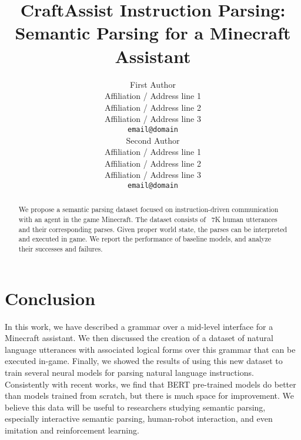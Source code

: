 \documentclass[11pt,a4paper]{article}
\title{CraftAssist Instruction Parsing: Semantic Parsing for a Minecraft Assistant}
\author{First Author \\
  Affiliation / Address line 1 \\
  Affiliation / Address line 2 \\
  Affiliation / Address line 3 \\
  {\tt email@domain} \\\And
  Second Author \\
  Affiliation / Address line 1 \\
  Affiliation / Address line 2 \\
  Affiliation / Address line 3 \\
  {\tt email@domain} \\}
\date{}
\begin{document}
\maketitle
\begin{abstract}
We propose a semantic parsing dataset focused on instruction-driven communication with an agent in the game Minecraft.  
The dataset consists of 
 ~7K human utterances and their corresponding parses.  Given proper world state, the parses can be interpreted and executed in game. 
We report the performance of baseline models, and analyze their successes and failures.
\end{abstract}








\section{Conclusion}
In this work, we have described a grammar over a mid-level interface for a Minecraft assistant. We then discussed the creation of a dataset of natural language utterances with associated logical forms over this grammar that can be executed in-game. Finally, we showed the results of using this new dataset to train several neural models for parsing natural language instructions.  %
Consistently with recent works, we find that BERT pre-trained models do better than models trained from scratch, but there is much space for improvement.
We believe this data will be useful to researchers studying semantic parsing, especially interactive semantic parsing, human-robot interaction, and even imitation and reinforcement learning.  






\clearpage




\clearpage

\appendix

\label{sec:supplemental}




% 
\end{document}

